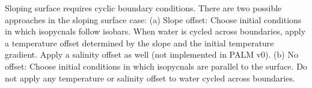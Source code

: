 Sloping surface requires cyclic boundary conditions. There are two possible approaches in the sloping surface case:
(a) Slope offset: Choose initial conditions in which isopycnals follow isobars. When water is cycled across boundaries, apply a temperature offset determined by the slope and the initial temperature gradient. Apply a salinity offset as well (not implemented in PALM v0).
(b) No offset: Choose initial conditions in which isopycnals are parallel to the surface. Do not apply any temperature or salinity offset to water cycled across boundaries.